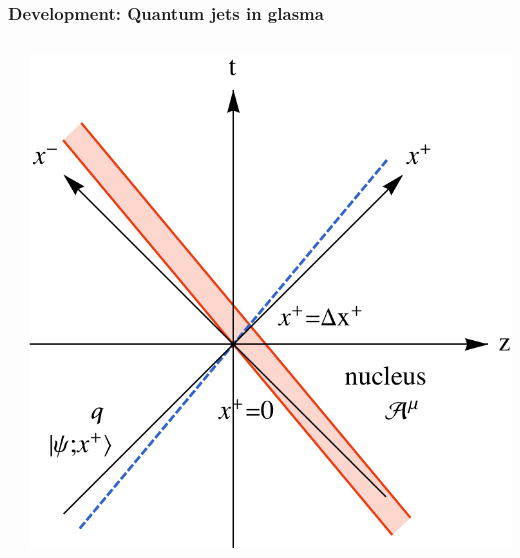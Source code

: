 \documentclass[aspectratio=169,11pt,usenames,dvipsnames]{beamer}
\begin{document}
\begin{frame}
    \frametitle{{\normalsize\color{jyured}\bfseries\sffamily Development: }Quantum jets in glasma}
    \vspace{-15pt}
    \begin{center}
        \begin{columns}[onlytextwidth,t]
           \begin{center}
                
            \end{center}

            \vspace{-10pt}
            \begin{center}
                \includegraphics[width=0.88\columnwidth]{images/qA_worldline_mono.pdf}
            \end{center}


\end{columns}
\end{center}
\end{frame}
\end{document}
